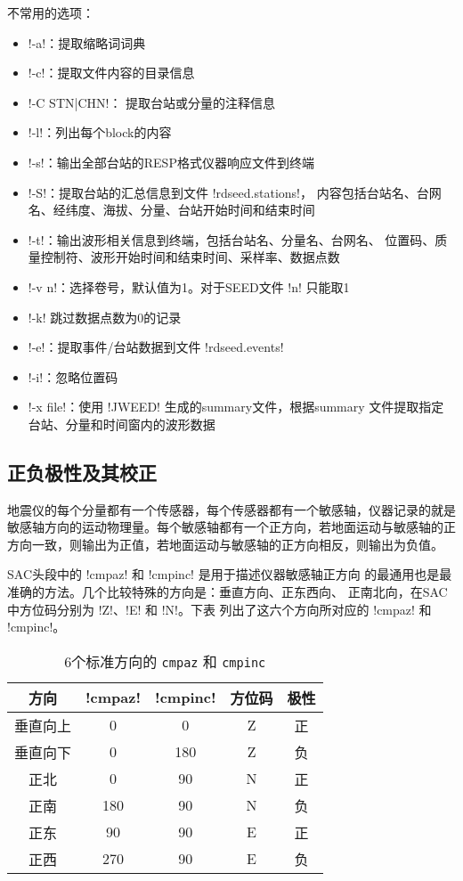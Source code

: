 不常用的选项：
\begin{itemize}
\item !-a!：提取缩略词词典
\item !-c!：提取文件内容的目录信息
\item !-C STN|CHN!： 提取台站或分量的注释信息
\item !-l!：列出每个block的内容
\item !-s!：输出全部台站的RESP格式仪器响应文件到终端
\item !-S!：提取台站的汇总信息到文件 !rdseed.stations!，
    内容包括台站名、台网名、经纬度、海拔、分量、台站开始时间和结束时间
\item !-t!：输出波形相关信息到终端，包括台站名、分量名、台网名、
    位置码、质量控制符、波形开始时间和结束时间、采样率、数据点数
\item !-v n!：选择卷号，默认值为1。对于SEED文件 !n! 只能取1
\item !-k! 跳过数据点数为0的记录
\item !-e!：提取事件/台站数据到文件 !rdseed.events!
\item !-i!：忽略位置码
\item !-x file!：使用 !JWEED! 生成的summary文件，根据summary
    文件提取指定台站、分量和时间窗内的波形数据
\end{itemize}

\subsection{正负极性及其校正}
\label{subsec:polarity-correction}

地震仪的每个分量都有一个传感器，每个传感器都有一个敏感轴，仪器记录的就是
敏感轴方向的运动物理量。每个敏感轴都有一个正方向，若地面运动与敏感轴的正
方向一致，则输出为正值，若地面运动与敏感轴的正方向相反，则输出为负值。

SAC头段中的 !cmpaz! 和 !cmpinc! 是用于描述仪器敏感轴正方向
的最通用也是最准确的方法。几个比较特殊的方向是：垂直方向、正东西向、
正南北向，在SAC中方位码分别为 !Z!、!E! 和 !N!。下表
列出了这六个方向所对应的 !cmpaz! 和 !cmpinc!。
\begin{table}[H]
\caption{6个标准方向的 \texttt{cmpaz} 和 \texttt{cmpinc}}
\label{table:six-cmpaz-cmpinc}
\centering
\begin{tabular}{ccccc}
\toprule
方向     &   !cmpaz! & !cmpinc!  & 方位码 & 极性  \\
\midrule
垂直向上 &   0              &  0               & Z      & 正    \\
垂直向下 &   0              &  180             & Z      & 负    \\
正北     &   0              &  90              & N      & 正    \\
正南     &   180            &  90              & N      & 负    \\
正东     &   90             &  90              & E      & 正    \\
正西     &   270            &  90              & E      & 负    \\
\bottomrule
\end{tabular}
\end{table}

